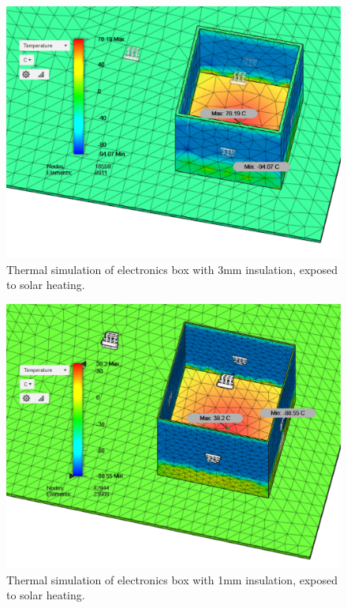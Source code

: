 	\begin{figure}[h!]
    \centering    	
    \includegraphics[scale=0.6]{4-experiment-design/img/mechanical/3mmthickheat.PNG}
	\caption{Thermal simulation of electronics box with 3mm insulation, exposed to solar heating.}
	\label{fig:3mmthickheat}
	\end{figure}

	\begin{figure}[h!]
    \centering  
    \includegraphics[scale=0.65]{4-experiment-design/img/mechanical/1mmthickheat.PNG}
	\caption{Thermal simulation of electronics box with 1mm insulation, exposed to solar heating.}
	\label{fig:1mmthickheat}    
    	\end{figure}
    	
